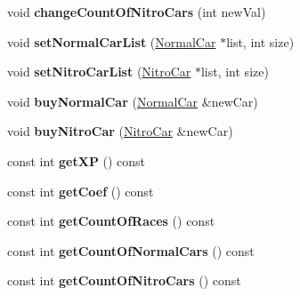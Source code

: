 \begin{DoxyCompactItemize}
\item 
void {\bfseries change\+Count\+Of\+Nitro\+Cars} (int new\+Val)\hypertarget{classRacer_a0ccf1d36ebe6295279d9222c734ee00c}{}\label{classRacer_a0ccf1d36ebe6295279d9222c734ee00c}

\item 
void {\bfseries set\+Normal\+Car\+List} (\hyperlink{classNormalCar}{Normal\+Car} $\ast$list, int size)\hypertarget{classRacer_a2782e176e778158fba8549b3cd812242}{}\label{classRacer_a2782e176e778158fba8549b3cd812242}

\item 
void {\bfseries set\+Nitro\+Car\+List} (\hyperlink{classNitroCar}{Nitro\+Car} $\ast$list, int size)\hypertarget{classRacer_a6b08bcc326dfd24ec7572928c74e82b7}{}\label{classRacer_a6b08bcc326dfd24ec7572928c74e82b7}

\item 
void {\bfseries buy\+Normal\+Car} (\hyperlink{classNormalCar}{Normal\+Car} \&new\+Car)\hypertarget{classRacer_af767c9e4549714d146d7958f225a76da}{}\label{classRacer_af767c9e4549714d146d7958f225a76da}

\item 
void {\bfseries buy\+Nitro\+Car} (\hyperlink{classNitroCar}{Nitro\+Car} \&new\+Car)\hypertarget{classRacer_ae547e00ba3cec533dfa3f6232a46d9aa}{}\label{classRacer_ae547e00ba3cec533dfa3f6232a46d9aa}

\item 
const int {\bfseries get\+XP} () const \hypertarget{classRacer_a88b00a44dfabc48a24bdc837adc56864}{}\label{classRacer_a88b00a44dfabc48a24bdc837adc56864}

\item 
const int {\bfseries get\+Coef} () const \hypertarget{classRacer_a756801af8255a6186c0ba3ddef1b8513}{}\label{classRacer_a756801af8255a6186c0ba3ddef1b8513}

\item 
const int {\bfseries get\+Count\+Of\+Races} () const \hypertarget{classRacer_a98fe48330cabd61417f35fbda507d244}{}\label{classRacer_a98fe48330cabd61417f35fbda507d244}

\item 
const int {\bfseries get\+Count\+Of\+Normal\+Cars} () const \hypertarget{classRacer_a60dcb635bc4d5bca21f67e1da86d3135}{}\label{classRacer_a60dcb635bc4d5bca21f67e1da86d3135}

\item 
const int {\bfseries get\+Count\+Of\+Nitro\+Cars} () const \hypertarget{classRacer_a835cda99f8ec96cc978380dde3dfaf06}{}\label{classRacer_a835cda99f8ec96cc978380dde3dfaf06}


\end{DoxyCompactItemize}
